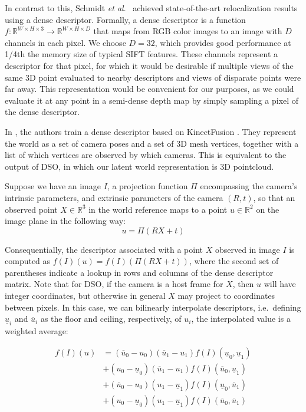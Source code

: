 In contrast to this, Schmidt \textit{et al}.\ \cite{schmidt2017self} achieved state-of-the-art relocalization results using a dense descriptor. Formally, a dense descriptor is a function $f : \mathbb{R}^{W \times H \times 3} \to \mathbb{R}^{W \times H \times D} $ that maps from RGB color images to an image with $D$ channels in each pixel. We choose $D=32$, which provides good performance at 1/4th the memory size of typical SIFT features. These channels represent a descriptor for that pixel, for which it would be desirable if multiple views of the same 3D point evaluated to nearby descriptors and views of disparate points were far away. This representation would be convenient for our purposes, as we could evaluate it at any point in a semi-dense depth map by simply sampling a pixel of the dense descriptor.

In \cite{schmidt2017self}, the authors train a dense descriptor based on KinectFusion \cite{newcombe2011kinectfusion}. They represent the world as a set of camera poses and a set of 3D mesh vertices, together with a list of which vertices are observed by which cameras. This is equivalent to the output of DSO, in which our latent world representation is 3D pointcloud. 

Suppose we have an image $I$, a projection function $\Pi$ encompassing the camera's intrinsic parameters, and extrinsic parameters of the camera $(R, t)$, so that an observed point $X \in \mathbb{R}^3$ in the world reference maps to a point $u \in \mathbb{R}^2$ on the image plane in the following way:
\begin{equation}
u = \Pi(RX + t)
\end{equation}

Consequentially, the descriptor associated with a point $X$ observed in image $I$ is computed as $f(I)(u) = f(I)(\Pi(RX + t))$, where the second set of parentheses indicate a lookup in rows and columns of the dense descriptor matrix. Note that for DSO, if the camera is a host frame for $X$, then $u$ will have integer coordinates, but otherwise in general $X$ may project to coordinates between pixels. In this case, we can bilinearly interpolate descriptors, i.e.\ defining $\underline{u}_i$ and $\overline{u}_i$ as the floor and ceiling, respectively, of $u_i$, the interpolated value is a weighted average:

\begin{equation}
\begin{aligned}
f(I)(u) &= (\overline{u}_0 - u_0) (\overline{u}_1 - u_1) f(I)(\underline{u}_0, \underline{u}_1) \\
        &+ (u_0 - \underline{u}_0) (\overline{u}_1 - u_1) f(I)(\overline{u}_0, \underline{u}_1) \\
        &+ (\overline{u}_0 - u_0) (u_1 - \underline{u}_1) f(I)(\underline{u}_0, \overline{u}_1) \\
        &+ (u_0 - \underline{u}_0) (u_1 - \underline{u}_1) f(I)(\overline{u}_0, \overline{u}_1)
\end{aligned}
\end{equation}

